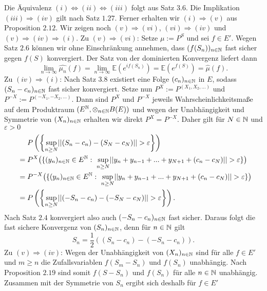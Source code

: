 \begin{proof*}
    Die Äquivalenz $(i) \iff (ii) \iff (iii)$ folgt aus Satz $3.6$. Die Implikation $(iii) \Rightarrow (iv)$ gilt nach Satz $1.27$. Ferner erhalten wir $(i) \Rightarrow (v)$ aus Proposition $2.12$.
    Wir zeigen noch $(v)\Rightarrow (vi)$, $(vi) \Rightarrow (iv)$ und $(v) \Rightarrow (iv) \Rightarrow (i)$. 
    \newline
    Zu $(v)\Rightarrow (vi)$: Setze $\mu := P^S$ und sei $f \in E'$. Wegen Satz $2.6$ können wir ohne Einschränkung annehmen, dass $(f(S_n))_{n \in \mathbb{N}}$ fast sicher gegen $f(S)$ konvergiert. 
    Der Satz von der dominierten Konvergenz liefert dann 
    $$
        \lim_{n \to \infty}\widehat{\mu_n}(f) = \lim_{n \to \infty}\mathbb{E}(e^{if(S_n)}) = \mathbb{E}(e^{f(S)}) = \widehat{\mu}(f).
    $$
    \newline
    Zu $(iv) \Rightarrow (i)$:
    Nach Satz $3.8$ existiert eine Folge $(c_n)_{n \in \mathbb{N}}$ in $E$, sodass $(S_n - c_n)_{n \in \mathbb{N}}$ fast sicher konvergiert. Setze nun $P^X := P^{(X_1,X_2,...)}$ und $P^{-X} :=P^{(-X_1,-X_2,...)}$. 
    Dann sind $P^X$ und $P^{-X}$ jeweils Wahrscheinlichkeitsmaße auf dem Produktraum $(E^{\mathbb{N}}, \otimes_{n \in \mathbb{N}}B(E))$ und wegen der Unabhängigkeit und Symmetrie von $(X_n)_{n \in \mathbb{N}}$ erhalten wir direkt $P^X = P^{-X}$. Daher gilt für $N \in \mathbb{N}$ und $\varepsilon >0$
    \begin{align*}
        &\quad \ \prob{\sup_{n \geq N}\norm{(S_n - c_n) - (S_N- c_N)} > \varepsilon} \\\
                &= P^X\big(\{(y_n)_{n \in \N}\in E^{\N}: \  \sup_{n \geq N}\norm{y_n + y_{n-1} + ... + y_{N+1} + (c_n - c_N)} > \varepsilon \}\big) \\\
                &= P^{-X}\big(\{(y_n)_{n \in \N}\in E^{\N}: \ \sup_{n \geq N}\norm{y_n + y_{n-1} + ... + y_{N+1} + (c_n - c_N)} > \varepsilon \}\big) \\\
                &= \prob{\sup_{n \geq N}\norm{(-S_n - c_n) - (-S_N - c_N)} > \varepsilon}.
    \end{align*}
    Nach Satz $2.4$ konvergiert also auch $(-S_n - c_n)_{n \in \mathbb{N}}$ fast sicher. Daraus folgt die fast sichere Konvergenz von $(S_n)_{n \in \mathbb{N}}$, denn für $n \in \mathbb{N}$ gilt
    $$
       S_n =  \frac{1}{2}((S_n - c_n) - (-S_n -c_n)). 
    $$
    Zu $(v) \Rightarrow (iv)$: Wegen der Unabhängigkeit von $(X_n)_{n \in \mathbb{N}}$ sind für alle $f \in E'$ und $m \geq n$ die Zufallsvariablen $f(S_m - S_n)$ und $f(S_n)$ unabhängig. 
    Nach Proposition $2.19$ sind somit $f(S-S_n)$ und $f(S_n)$ für alle $n \in \mathbb{N}$ unabhängig. Zusammen mit der Symmetrie von $S_n$ ergibt sich deshalb für $f \in E'$

\end{proof*}
